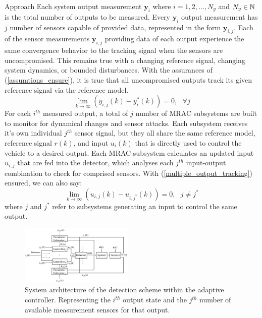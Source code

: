 \begin{section}{Approach}
Each system output measurement $\bm{y}_i$ where $i=1,2,\dots,N_y$ and $N_y \in \mathbb{N}$ is the total number of outputs to be measured. Every $\bm{y}_i$ output measurement has $j$ number of sensors capable of provided data, represented in the form $\bm{y}_{i,j}$. Each of the sensor measurements $\bm{y}_{i,j}$ providing data of each output experience the same convergence behavior to the tracking signal when the sensors are uncompromised. This remains true with a changing reference signal, changing system dynamics, or bounded disturbances. 
With the assurances of (\ref{assumtions_ensure}), it is true that all uncompromised outputs track its given reference signal via the reference model.
\begin{equation}
\label{multiple_output_tracking}
    \lim_{k\to\infty}(y_{i,j}(k)-y^*_i(k))=0, \text{ }\forall j
\end{equation}
For each $i^{th}$ measured output, a total of $j$ number of MRAC subsystems are built to monitor for dynamical changes and sensor attacks. Each subsystem receives it's own individual $j^{th}$ sensor signal, but they all share the same reference model, reference signal $r(k)$, and input $u_i(k)$ that is directly used to control the vehicle to a desired output. Each MRAC subsystem calculates an updated input $u_{i,j}$ that are fed into the detector, which analyses each $j^{th}$ input-output combination to check for comprised sensors. With (\ref{multiple_output_tracking}) ensured, we can also say:
\begin{equation}
    \lim_{k\to\infty}(u_{i,j}(k)-u_{i,j^*}(k))=0, \text{ }j\neq j^*
\end{equation}
where $j$ and $j^*$ refer to subsystems generating an input to control the same output.


\begin{figure}[ht!]
\vspace{1pt}
\centering
\includegraphics[width=0.48\textwidth]{con_and_det.png}
\caption{System architecture of the detection scheme within the adaptive controller. Representing the $i^{th}$ output state and the $j^{th}$ number of available measurement sensors for that output.}
\label{fig:det_arch}
\end{figure}


\end{section}
